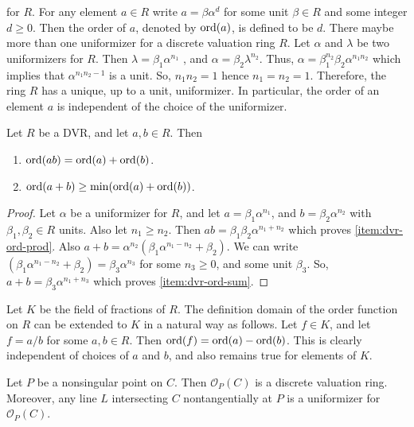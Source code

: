 for $R$. For any element $a \in R$ write $a = \beta\alpha^d$ for some unit $\beta \in R$ and some 
integer $d \ge 0$. Then the order of $a$, denoted by $\operatorname{ord}(a)$, is defined to be $d$. There maybe 
more than one uniformizer for a discrete valuation ring $R$. Let $\alpha$ and $\lambda$ be two 
uniformizers for $R$. Then $\lambda = \beta_1\alpha^{n_1}$  , and $\alpha = \beta_2\lambda^{n_2}$. 
Thus, $\alpha = \beta_1^{n_2}\beta_2\alpha^{n_1n_2}$ which implies that $\alpha^{n_1n_2 - 1}$ is a 
unit. So, $n_1n_2 = 1$ hence $n_1 = n_2 = 1$. Therefore, the ring $R$ has a unique, up to a unit, 
uniformizer. In particular, the order of an element $a$ is independent of the choice of the 
uniformizer. 
\begin{lemma}
\label{lemma:dvr-ord}
Let $R$ be a DVR, and let $a, b \in R$. Then
\begin{enumerate}
\item 
\label{item:dvr-ord-prod}
$\operatorname{ord}(ab) = \operatorname{ord}(a) + \operatorname{ord}(b)$.
\item 
\label{item:dvr-ord-sum}
$\operatorname{ord}(a + b) \ge \min(\operatorname{ord}(a) + \operatorname{ord}(b))$.
\end{enumerate}
\end{lemma}
\begin{proof}
Let $\alpha$ be a uniformizer for $R$, and let $a = \beta_1\alpha^{n_1}$, and $b = 
\beta_2\alpha^{n_2}$ with $\beta_1, \beta_2 \in R$ units. Also let $n_1 \ge n_2$. Then $ab = 
\beta_1\beta_2\alpha^{n_1 + n_2}$ which proves \ref{item:dvr-ord-prod}. Also $a + b = 
\alpha^{n_2}(\beta_1\alpha^{n_1 - n_2} + \beta_2)$. We can write $(\beta_1\alpha^{n_1 - n_2} + 
\beta_2) = \beta_3\alpha^{n_3}$ for some $n_3 \ge 0$, and some unit $\beta_3$. So, $a + b = 
\beta_3\alpha^{n_1 + n_3}$ which proves \ref{item:dvr-ord-sum}.
\end{proof}
Let $K$ be the field of fractions of $R$. The definition domain of the order function on $R$ can be 
extended to $K$ in a natural way as follows. Let $f \in K$, and let $f = a / b$ for some $a, b \in 
R$. Then $\operatorname{ord}(f) = \operatorname{ord}(a) - \operatorname{ord}(b)$. This is clearly independent of choices of $a$ and $b$, 
and also  remains true for elements of $K$.
\begin{theorem}
\label{theorem:un-par}
Let $P$ be a nonsingular point on $C$. Then $\mathcal{O}_P(C)$ is a discrete valuation ring. 
Moreover, any line $L$ intersecting $C$ nontangentially at $P$ is a uniformizer for 
$\mathcal{O}_P(C)$.
\end{theorem}
